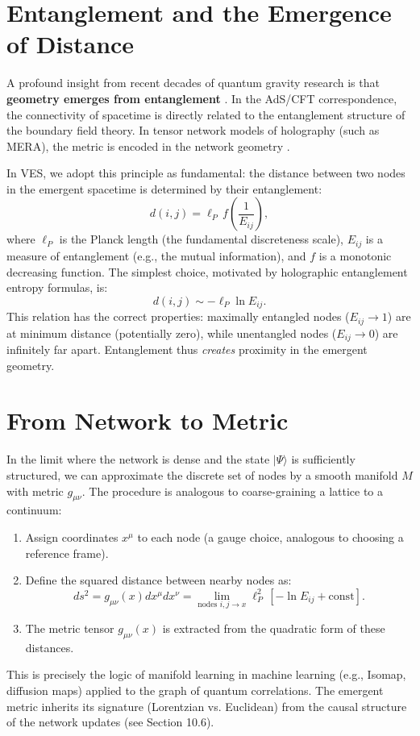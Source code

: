 \documentclass[12pt,a4paper]{book}
\begin{document}
\section{Entanglement and the Emergence of Distance}

A profound insight from recent decades of quantum gravity research is that \textbf{geometry emerges from entanglement} \cite{vanraamsdonk2010building, maldacena1998ads}. In the AdS/CFT correspondence, the connectivity of spacetime is directly related to the entanglement structure of the boundary field theory. In tensor network models of holography (such as MERA), the metric is encoded in the network geometry \cite{swingle2012entanglement}.

In VES, we adopt this principle as fundamental: the distance between two nodes in the emergent spacetime is determined by their entanglement:
\begin{equation}
    d(i,j) = \ell_P \, f\left( \frac{1}{E_{ij}} \right),
\end{equation}
where $\ell_P$ is the Planck length (the fundamental discreteness scale), $E_{ij}$ is a measure of entanglement (e.g., the mutual information), and $f$ is a monotonic decreasing function. The simplest choice, motivated by holographic entanglement entropy formulas, is:
\begin{equation}
    d(i,j) \sim -\ell_P \ln E_{ij}.
\end{equation}
This relation has the correct properties: maximally entangled nodes ($E_{ij} \to 1$) are at minimum distance (potentially zero), while unentangled nodes ($E_{ij} \to 0$) are infinitely far apart. Entanglement thus \textit{creates} proximity in the emergent geometry.

\section{From Network to Metric}

In the limit where the network is dense and the state $|\Psi\rangle$ is sufficiently structured, we can approximate the discrete set of nodes by a smooth manifold $M$ with metric $g_{\mu\nu}$. The procedure is analogous to coarse-graining a lattice to a continuum:
\begin{enumerate}
    \item Assign coordinates $x^\mu$ to each node (a gauge choice, analogous to choosing a reference frame).
    \item Define the squared distance between nearby nodes as:
    \begin{equation}
        ds^2 = g_{\mu\nu}(x) dx^\mu dx^\nu = \lim_{\text{nodes } i,j \to x} \ell_P^2 \, [-\ln E_{ij} + \text{const}].
    \end{equation}
    \item The metric tensor $g_{\mu\nu}(x)$ is extracted from the quadratic form of these distances.
\end{enumerate}
This is precisely the logic of manifold learning in machine learning (e.g., Isomap, diffusion maps) applied to the graph of quantum correlations. The emergent metric inherits its signature (Lorentzian vs. Euclidean) from the causal structure of the network updates (see Section 10.6).
\end{document}
